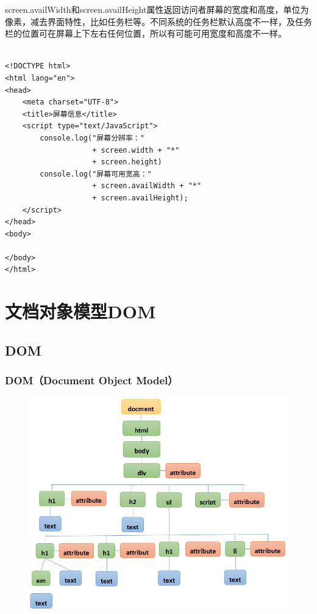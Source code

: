 screen.availWidth和screen.availHeight属性返回访问者屏幕的宽度和高度，单位为像素，减去界面特性，比如任务栏等。不同系统的任务栏默认高度不一样，及任务栏的位置可在屏幕上下左右任何位置，所以有可能可用宽度和高度不一样。 \\

 \\

\begin{lstlisting}[style=htmlcssjs]
<!DOCTYPE html>
<html lang="en">
<head>
    <meta charset="UTF-8">
    <title>屏幕信息</title>
    <script type="text/JavaScript">
        console.log("屏幕分辨率："
					+ screen.width + "*"
					+ screen.height)
        console.log("屏幕可用宽高："
					+ screen.availWidth + "*"
					+ screen.availHeight);
    </script>
</head>
<body>

</body>
</html>
\end{lstlisting}

\newpage

\chapter{文档对象模型DOM}

\section{DOM}

\subsection{DOM（Document Object Model）}

\begin{figure}[H]
	\centering
	\includegraphics[scale=0.8]{img/C17/17-1/1.png}
\end{figure}

